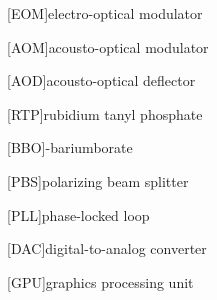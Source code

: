 [EOM]{electro-optical modulator}

[AOM]{acousto-optical modulator}

[AOD]{acousto-optical deflector}

[RTP]{rubidium tanyl phosphate}

[BBO]{\textbeta-bariumborate}

[PBS]{polarizing beam splitter}

[PLL]{phase-locked loop}

[DAC]{digital-to-analog converter}

[GPU]{graphics processing unit}
